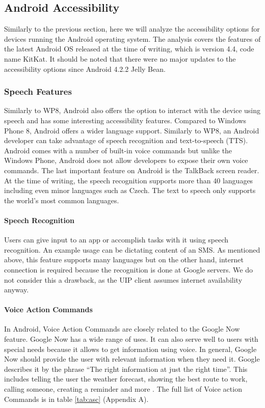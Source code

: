 \subsection{Android Accessibility}
Similarly to the previous section, here we will analyze the accessibility options for devices running the Android operating system. The analysis covers the features of the latest Android OS released at the time of writing, which is version 4.4, code name KitKat. It should be noted that there were no major updates to the accessibility options since Android 4.2.2 Jelly Bean.

\subsubsection{Speech Features}
Similarly to WP8, Android also offers the option to interact with the device using speech and has some interesting accessibility features. Compared to Windows Phone 8, Android offers a wider language support. Similarly to WP8, an Android developer can take advantage of speech recognition and text-to-speech (TTS). Android comes with a number of built-in voice commands but unlike the Windows Phone, Android does not allow developers to expose their own voice commands. The last important feature on Android is the TalkBack screen reader.
At the time of writing, the speech recognition supports more than 40 languages including even minor languages such as Czech. The text to speech only supports the world's most common languages.

\paragraph{Speech Recognition}
Users can give input to an app or accomplish tasks with it using speech recognition. An example usage can be dictating content of an SMS. As mentioned above, this feature supports many languages but on the other hand, internet connection is required \cite{androidRecog} because the recognition is done at Google servers. We do not consider this a drawback, as the UIP client assumes internet availability anyway.

\paragraph{Voice Action Commands}
In Android, Voice Action Commands are closely related to the Google Now feature. Google Now has a wide range of uses. It can also serve well to users with special needs because it allows to get information using voice.
In general, Google Now should provide the user with relevant information when they need it. Google describes it by the phrase “The right information at just the right time”. This includes telling the user the weather forecast, showing the best route to work, calling someone, creating a reminder and more \cite{googleNow}. The full list of Voice action Commands is in table \ref{tab:asc} (Appendix A).

